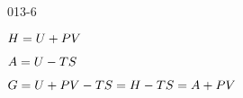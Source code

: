 \begin{mitframe}{013-6} %

    
\begin{listone}
        
    \item $\enthalpy = \intenergy + \p\vol$
        
    \item $\helmholtz = \intenergy - \Temp\entropy$
         
    \item $\gibbs = \intenergy + \p\vol - \Temp\entropy = \enthalpy - \Temp\entropy = \helmholtz + \p\vol$
    
\end{listone}			

\end{mitframe}